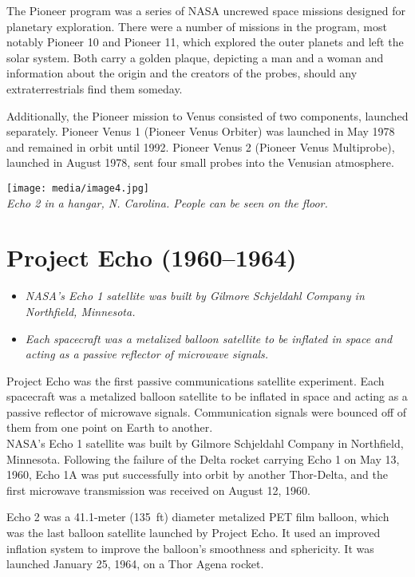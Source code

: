 The Pioneer program was a series of NASA uncrewed space missions
designed for planetary exploration. There were a number of missions in
the program, most notably Pioneer 10 and Pioneer 11, which explored the
outer planets and left the solar system. Both carry a golden plaque,
depicting a man and a woman and information about the origin and the
creators of the probes, should any extraterrestrials find them someday.

Additionally, the Pioneer mission to Venus consisted of two components,
launched separately. Pioneer Venus 1 (Pioneer Venus Orbiter) was
launched in May 1978 and remained in orbit until 1992. Pioneer Venus 2
(Pioneer Venus Multiprobe), launched in August 1978, sent four small
probes into the Venusian atmosphere.

\texttt{[image: media/image4.jpg]}\\
\emph{Echo 2 in a hangar, N. Carolina. People can be seen on the floor.}

\section{Project Echo (1960--1964)}\label{project-echo-19601964}

\begin{itemize}
\item
  \emph{NASA's Echo 1 satellite was built by Gilmore Schjeldahl Company
  in Northfield, Minnesota.}
\item
  \emph{Each spacecraft was a metalized balloon satellite to be inflated
  in space and acting as a passive reflector of microwave signals.}
\end{itemize}

Project Echo was the first passive communications satellite experiment.
Each spacecraft was a metalized balloon satellite to be inflated in
space and acting as a passive reflector of microwave signals.
Communication signals were bounced off of them from one point on Earth
to another.\\
NASA's Echo 1 satellite was built by Gilmore Schjeldahl Company in
Northfield, Minnesota. Following the failure of the Delta rocket
carrying Echo 1 on May 13, 1960, Echo 1A was put successfully into orbit
by another Thor-Delta, and the first microwave transmission was received
on August 12, 1960.

Echo 2 was a 41.1-meter (135~ft) diameter metalized PET film balloon,
which was the last balloon satellite launched by Project Echo. It used
an improved inflation system to improve the balloon's smoothness and
sphericity. It was launched January 25, 1964, on a Thor Agena rocket.

